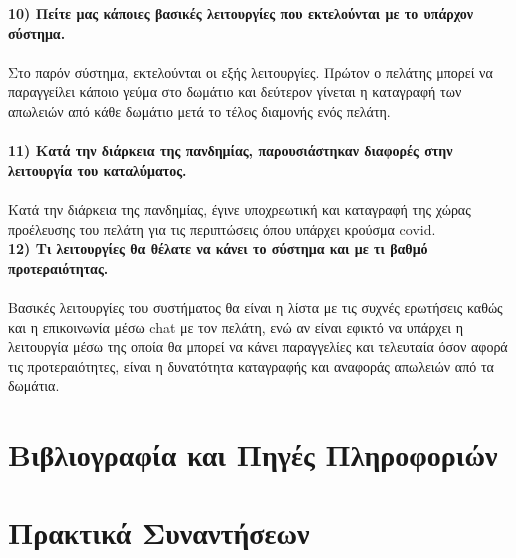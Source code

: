\noindent
\textbf{10) Πείτε μας κάποιες βασικές λειτουργίες που εκτελούνται με το υπάρχον 
	σύστημα.}\\ \\
Στο παρόν σύστημα, εκτελούνται οι εξής λειτουργίες. Πρώτον ο πελάτης μπορεί να
παραγγείλει κάποιο γεύμα στο δωμάτιο και δεύτερον γίνεται η καταγραφή των 
απωλειών από κάθε δωμάτιο μετά το τέλος διαμονής ενός πελάτη.\\ \\ 

\noindent
\textbf{11) Κατά την διάρκεια της πανδημίας, παρουσιάστηκαν διαφορές στην
	λειτουργία του καταλύματος.} \\ \\
Κατά την διάρκεια της πανδημίας, έγινε υποχρεωτική και καταγραφή της χώρας
προέλευσης του πελάτη για τις περιπτώσεις όπου υπάρχει κρούσμα covid. \\ 

\noindent
\textbf{12) Τι λειτουργίες θα θέλατε να κάνει το σύστημα και με τι βαθμό 
	προτεραιότητας.} \\ \\
Βασικές λειτουργίες του συστήματος θα είναι η λίστα με τις συχνές ερωτήσεις 
καθώς και η επικοινωνία μέσω chat με τον πελάτη, ενώ αν είναι εφικτό να υπάρχει
η λειτουργία μέσω της οποία θα μπορεί να κάνει παραγγελίες και τελευταία όσον 
αφορά τις προτεραιότητες, είναι η δυνατότητα καταγραφής και αναφοράς απωλειών
από τα δωμάτια. 

\section{Βιβλιογραφία και Πηγές Πληροφοριών}
\section{Πρακτικά Συναντήσεων}